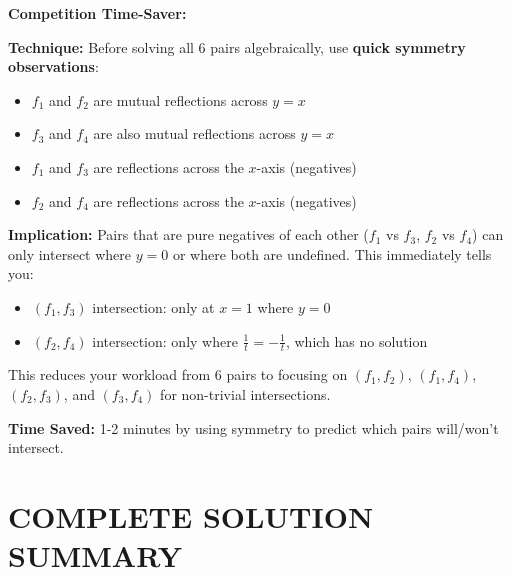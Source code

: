 \documentclass[12pt]{article}
\begin{document}
\begin{protipbox}
\textbf{Competition Time-Saver:}

\textbf{Technique:} Before solving all 6 pairs algebraically, use \textbf{quick symmetry observations}:
\begin{itemize}
    \item $f_1$ and $f_2$ are mutual reflections across $y = x$
    \item $f_3$ and $f_4$ are also mutual reflections across $y = x$
    \item $f_1$ and $f_3$ are reflections across the $x$-axis (negatives)
    \item $f_2$ and $f_4$ are reflections across the $x$-axis (negatives)
\end{itemize}

\textbf{Implication:} Pairs that are pure negatives of each other ($f_1$ vs $f_3$, $f_2$ vs $f_4$) can only intersect where $y = 0$ or where both are undefined. This immediately tells you:
\begin{itemize}
    \item $(f_1, f_3)$ intersection: only at $x = 1$ where $y = 0$
    \item $(f_2, f_4)$ intersection: only where $\frac{1}{t} = -\frac{1}{t}$, which has no solution
\end{itemize}

This reduces your workload from 6 pairs to focusing on $(f_1, f_2)$, $(f_1, f_4)$, $(f_2, f_3)$, and $(f_3, f_4)$ for non-trivial intersections.

\textbf{Time Saved:} 1-2 minutes by using symmetry to predict which pairs will/won't intersect.
\end{protipbox}

\section{COMPLETE SOLUTION SUMMARY}
\end{document}
